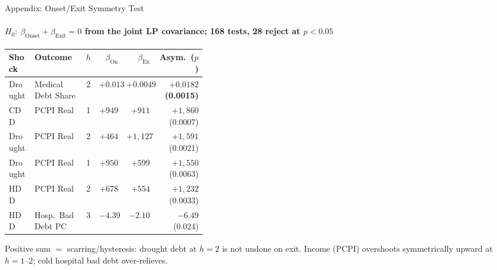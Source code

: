 \documentclass[aspectratio=169,11pt]{beamer}
\newcommand{\emphcolor}[1]{{\color{WarmOrange}\textbf{#1}}}
\newcommand{\graytext}[1]{{\color{WarmGray}#1}}
\begin{document}
\begin{frame}[label=appxsymmetry]{Appendix: Onset/Exit Symmetry Test}
  \framesubtitle{$H_0:\ \beta_\text{Onset} + \beta_\text{Exit} = 0$ from the joint LP covariance; 168 tests, 28 reject at $p<0.05$}
  \scriptsize
  \begin{tabular}{@{}>{\raggedright\arraybackslash}p{0.13\linewidth}>{\raggedright\arraybackslash}p{0.26\linewidth}crrr@{}}
    \toprule
    Shock & Outcome & $h$ & $\beta_\text{On}$ & $\beta_\text{Ex}$ & Asym.\ ($p$) \\
    \midrule
    Drought & Medical Debt Share & 2 & $+0.0133$ & $+0.0049$ & \emphcolor{$+0.0182$ (0.0015)} \\
    CDD     & PCPI Real          & 1 & $+949$ & $+911$   & $+1{,}860$ (0.0007) \\
    Drought & PCPI Real          & 2 & $+464$ & $+1{,}127$ & $+1{,}591$ (0.0021) \\
    Drought & PCPI Real          & 1 & $+950$ & $+599$   & $+1{,}550$ (0.0063) \\
    HDD     & PCPI Real          & 2 & $+678$ & $+554$   & $+1{,}232$ (0.0033) \\
    HDD     & Hosp.\ Bad Debt PC & 3 & $-4.39$ & $-2.10$ & $-6.49$ (0.024) \\
    \bottomrule
  \end{tabular}
  \vspace{0.35em}\par
  \graytext{\scriptsize Positive sum $=$ scarring/hysteresis: drought debt at $h{=}2$ is not undone on exit. Income (PCPI) overshoots symmetrically upward at $h{=}1$--2; cold hospital bad debt over-relieves.}
  \par\vspace{0.3em}\hfill\hyperlink{p2res}{}
\end{frame}
\end{document}
